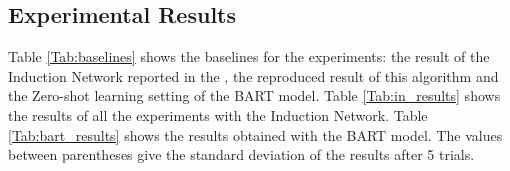 \documentclass{esannV2}
\begin{document}
    \subsection{Experimental Results}
    \label{results}
    Table \ref{Tab:baselines} shows the baselines for the experiments: the result of the Induction Network reported in the \cite{geng-etal-2019-induction}, the reproduced result of this algorithm and the Zero-shot learning setting of the BART model. Table \ref{Tab:in_results} shows the results of all the experiments with the Induction Network. Table \ref{Tab:bart_results} shows the results obtained with the BART model. The values between parentheses give the standard deviation of the results after 5 trials.
    
    
\end{document}
